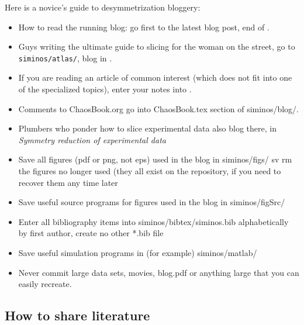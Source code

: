 Here is a novice's guide to desymmetrization bloggery:
\begin{itemize}
  \item
How to read the running blog: go first to the latest blog post, end
of .
  \item
Guys writing the ultimate guide to slicing for the woman on the street,
go to \texttt{siminos/atlas/}, blog in .
  \item
If you are reading an article of common interest (which does not fit into
one of the specialized topics), enter your notes into .
  \item
Comments to ChaosBook.org go into ChaosBook.tex section of siminos/blog/.
  \item
Plumbers who ponder how to slice experimental data also blog there,  in
 {\em Symmetry reduction of experimental data}
  \item
Save all figures (pdf or png, not eps) used in the blog in siminos/figs/
sv rm the figures no longer used (they all exist on the repository, if
you need to recover them any time later
  \item
Save useful source programs for figures used in the blog in siminos/figSrc/
  \item
Enter all bibliography items into siminos/bibtex/siminos.bib alphabetically by
first author, create no other *.bib file
  \item
Save useful simulation programs  in (for example) siminos/matlab/
  \item
Never commit large data sets, movies, blog.pdf or anything large that you
can easily recreate.


\end{itemize}

\subsection{How to share literature}
\label{s:HowToLit}

